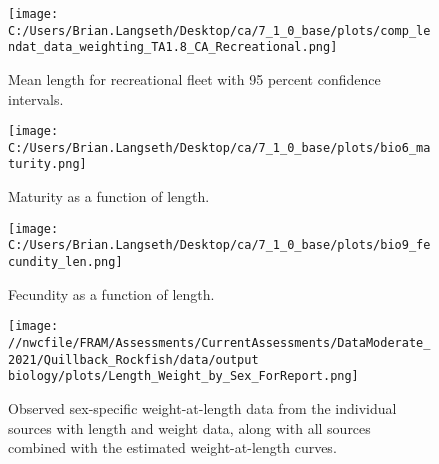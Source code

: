 \documentclass[11pt,
  english,
  a4paper,
]{article}
\begin{document}
\begin{figure}
\centering
\texttt{[image: C:/Users/Brian.Langseth/Desktop/ca/7\_1\_0\_base/plots/comp\_lendat\_data\_weighting\_TA1.8\_CA\_Recreational.png]}
\caption{Mean length for recreational fleet with 95 percent confidence intervals.\label{fig:mean-rec-len-data}}
\end{figure}

\tagmcend\tagstructend


\begin{figure}
\centering
\texttt{[image: C:/Users/Brian.Langseth/Desktop/ca/7\_1\_0\_base/plots/bio6\_maturity.png]}
\caption{Maturity as a function of length.\label{fig:maturity}}
\end{figure}

\tagmcend\tagstructend


\begin{figure}
\centering
\texttt{[image: C:/Users/Brian.Langseth/Desktop/ca/7\_1\_0\_base/plots/bio9\_fecundity\_len.png]}
\caption{Fecundity as a function of length.\label{fig:fecundity}}
\end{figure}

\tagmcend\tagstructend


\begin{figure}
\centering
\texttt{[image: //nwcfile/FRAM/Assessments/CurrentAssessments/DataModerate\_2021/Quillback\_Rockfish/data/output biology/plots/Length\_Weight\_by\_Sex\_ForReport.png]}
\caption{Observed sex-specific weight-at-length data from the individual sources with length and weight data, along with all sources combined with the estimated weight-at-length curves.\label{fig:len-weight-survey}}
\end{figure}

\tagmcend\tagstructend

\end{document}
